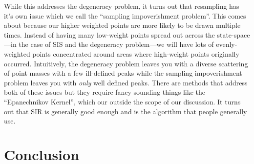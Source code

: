 \documentclass{article}
\begin{document}
While this addresses the degeneracy problem, it turns out that resampling has it's own issue which we call the ``sampling impoverishment problem''. This comes about because our higher weighted points are more likely to be drawn multiple times. Instead of having many low-weight points spread out across the state-space---in the case of SIS and the degeneracy problem---we will have lots of evenly-weighted points concentrated around areas where high-weight points originally occurred. Intuitively, the degeneracy problem leaves you with a diverse scattering of point masses with a few ill-defined peaks while the sampling impoverishment problem leaves you with \textit{only} well defined peaks. There are methods that address both of these issues but they require fancy sounding things like the ``Epanechnikov Kernel'', which our outside the scope of our discussion. It turns out that SIR is generally good enough and is the algorithm that people generally use.

\section{Conclusion}








\end{document}
